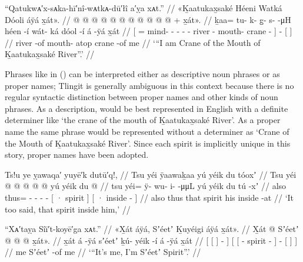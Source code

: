 \ex\label{ex:100-154-its-me-spirit-inside-him}%
%
\begingl
	\glpreamble	“Qatukwᴀ′x-sᴀka-hī′nî-wᴀtkᴀ-dū′łî a′ỵa xᴀt.” //
	\glpreamble	«\!Ḵaatukax̱saké Héeni Watká Dóoli áÿá x̱át\!». //
	\gla	{}  @ {} @ {} @ {} @ {} @ {} @ {} @ {}
			 @ {}
			 @ {}
			 @ {} {}
		 @ {} +
		{} x̱át\!». {} //
	\glb	{} ḵaa= tu- k- {} g̱- s-  -μH
			héen -í
			wát- ká
			dóol -í {}
		á -ÿá
		{} x̱át {} //
	\glc	{}[ = mind- - \· - -  -
			river -
			mouth- 
			crane - {}]
		 -
		{}[  {}] //
	\gld	{}  {} {} {} {} {} {} {}
			river -of
			mouth- atop
			crane -of {}
		 {}
		{} me {} //
	\glft	‘“I am Crane of the Mouth of Ḵaatukax̱saké River”.’
		//
\endgl
\xe

Phrases like  in (\lastx) can be interpreted either as descriptive noun phrases or as proper names; Tlingit is generally ambiguous in this context because there is no regular syntactic distinction between proper names and other kinds of noun phrases.
As a description,  would be best represented in English with a definite determiner like ‘the crane of the mouth of Ḵaatukax̱saké River’.
As a proper name the same phrase would be represented without a determiner as ‘Crane of the Mouth of Ḵaatukax̱saké River’.
Since each spirit is implicitly unique in this story, proper names have been adopted.

\ex\label{ex:100-155-that-spirit-too}%
%
\begingl
	\glpreamble	Ts!u ye ỵawaqa′ yuyē′k dutū′q!, //
	\glpreamble	Tsu yéi ÿaawaḵaa yú yéik du tóoxʼ //
	\gla	Tsu yéi @  @ {} @ {} @ {} @ {}
		{} yú yéik {}
		{} du  @ {} {} //
	\glb	tsu yéi= ÿ- wu- i-  -μμL
		{} yú yéik {}
		{} du tú -xʼ {} //
	\glc	also thus= - - -  -
		{}[ · spirit {}]
		{}[ · inside - {}] //
	\gld	also thus  {} {} {} {}
		{} that spirit {}
		{} his inside -at {} //
	\glft	‘It too said, that spirit inside him,’
		//
\endgl
\xe

\ex\label{ex:100-156-seet-spirit}%
%
\begingl
	\glpreamble	“Xᴀ′taỵa Sîī′t-koyē′ga xᴀt.” //
	\glpreamble	«\!X̱át áÿá, Sʼéetʼ Ḵuyéigi áÿá x̱át\!». //
	\gla	{} {} X̱át {}  @ {} {}
		{} {} Sʼéetʼ  @ {} @ {} {}
			 @ {}
			{} x̱át\!». {} {} //
	\glb	{} {} x̱át {} á -ÿá {}
			{} {} sʼéetʼ ḵú- yéik -í {}
			á -ÿá {} x̱át {} {} //
	\glc	{}[ {}[  {}]  - {}]
		{}[ {}[  - spirit - {}]
			 -
			{}[  {}] {}] //
	\gld	{} {} me {}  {} {}
		{} {} Sʼéetʼ  {} -of {}
			 {} 
			{} me {} {} //
	\glft	‘“It’s me, I’m Sʼéetʼ Spirit”.’
		//
\endgl
\xe

